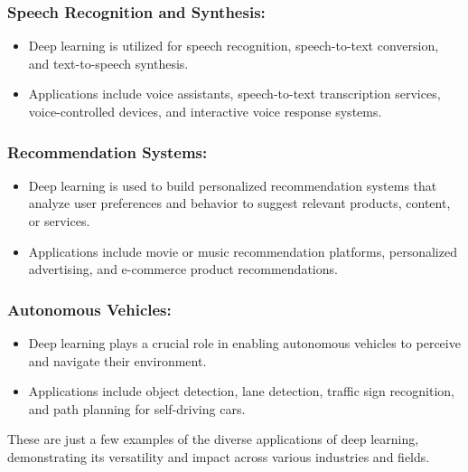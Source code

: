 \subsubsection*{Speech Recognition and Synthesis:}

\begin{itemize}
    \item Deep learning is utilized for speech recognition, speech-to-text conversion, and text-to-speech synthesis.
    \item Applications include voice assistants, speech-to-text transcription services, voice-controlled devices, and interactive voice response systems.
\end{itemize}

\subsubsection*{Recommendation Systems:}

\begin{itemize}
    \item Deep learning is used to build personalized recommendation systems that analyze user preferences and behavior to suggest relevant products, content, or services.
    \item Applications include movie or music recommendation platforms, personalized advertising, and e-commerce product recommendations.
\end{itemize}

\subsubsection*{Autonomous Vehicles:}

\begin{itemize}
    \item Deep learning plays a crucial role in enabling autonomous vehicles to perceive and navigate their environment.
    \item Applications include object detection, lane detection, traffic sign recognition, and path planning for self-driving cars.
\end{itemize}

These are just a few examples of the diverse applications of deep learning, demonstrating its versatility and impact across various industries and fields.